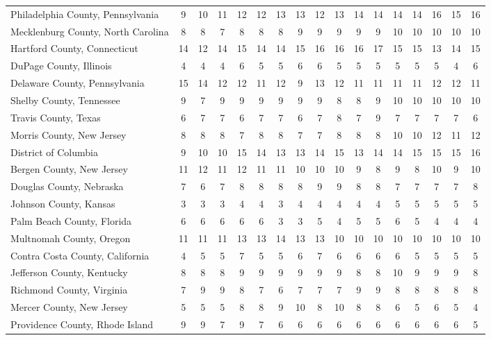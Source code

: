 \begin{landscape}
\begin{longtable}{lcccccccccccccccc}
	Philadelphia County, Pennsylvania & 9 & 10 & 11 & 12 & 12 & 13 & 13 & 12 & 13 & 14 & 14 & 14 & 14 & 16 & 15 & 16 \\
	Mecklenburg County, North Carolina & 8 & 8 & 7 & 8 & 8 & 8 & 9 & 9 & 9 & 9 & 9 & 10 & 10 & 10 & 10 & 10 \\
	Hartford County, Connecticut & 14 & 12 & 14 & 15 & 14 & 14 & 15 & 16 & 16 & 16 & 17 & 15 & 15 & 13 & 14 & 15 \\
	DuPage County, Illinois & 4 & 4 & 4 & 6 & 5 & 5 & 6 & 6 & 5 & 5 & 5 & 5 & 5 & 5 & 4 & 6 \\
	Delaware County, Pennsylvania & 15 & 14 & 12 & 12 & 11 & 12 & 9 & 13 & 12 & 11 & 11 & 11 & 11 & 12 & 12 & 11 \\
	Shelby County, Tennessee & 9 & 7 & 9 & 9 & 9 & 9 & 9 & 9 & 8 & 8 & 9 & 10 & 10 & 10 & 10 & 10 \\
	Travis County, Texas & 6 & 7 & 7 & 6 & 7 & 7 & 6 & 7 & 8 & 7 & 9 & 7 & 7 & 7 & 7 & 6 \\
	Morris County, New Jersey & 8 & 8 & 8 & 7 & 8 & 8 & 7 & 7 & 8 & 8 & 8 & 10 & 10 & 12 & 11 & 12 \\
	District of Columbia & 9 & 10 & 10 & 15 & 14 & 13 & 13 & 14 & 15 & 13 & 14 & 14 & 15 & 15 & 15 & 16 \\
	Bergen County, New Jersey & 11 & 12 & 11 & 12 & 11 & 11 & 10 & 10 & 10 & 9 & 8 & 9 & 8 & 10 & 9 & 10 \\
	Douglas County, Nebraska & 7 & 6 & 7 & 8 & 8 & 8 & 8 & 9 & 9 & 8 & 8 & 7 & 7 & 7 & 7 & 8 \\
	Johnson County, Kansas & 3 & 3 & 3 & 4 & 4 & 3 & 4 & 4 & 4 & 4 & 4 & 5 & 5 & 5 & 5 & 5 \\
	Palm Beach County, Florida & 6 & 6 & 6 & 6 & 6 & 3 & 3 & 5 & 4 & 5 & 5 & 6 & 5 & 4 & 4 & 4 \\
	Multnomah County, Oregon & 11 & 11 & 11 & 13 & 13 & 14 & 13 & 13 & 10 & 10 & 10 & 10 & 10 & 10 & 10 & 10 \\
	Contra Costa County, California & 4 & 5 & 5 & 7 & 5 & 5 & 6 & 7 & 6 & 6 & 6 & 6 & 5 & 5 & 5 & 5 \\
	Jefferson County, Kentucky & 8 & 8 & 8 & 9 & 9 & 9 & 9 & 9 & 9 & 8 & 8 & 10 & 9 & 9 & 9 & 8 \\
	Richmond County, Virginia & 7 & 9 & 9 & 8 & 7 & 6 & 7 & 7 & 7 & 9 & 9 & 8 & 8 & 8 & 8 & 8 \\
	Mercer County, New Jersey & 5 & 5 & 5 & 8 & 8 & 9 & 10 & 8 & 10 & 8 & 8 & 6 & 5 & 6 & 5 & 4 \\
	Providence County, Rhode Island & 9 & 9 & 7 & 9 & 7 & 6 & 6 & 6 & 6 & 6 & 6 & 6 & 6 & 6 & 6 & 5 \\

\end{longtable}
\end{landscape}
